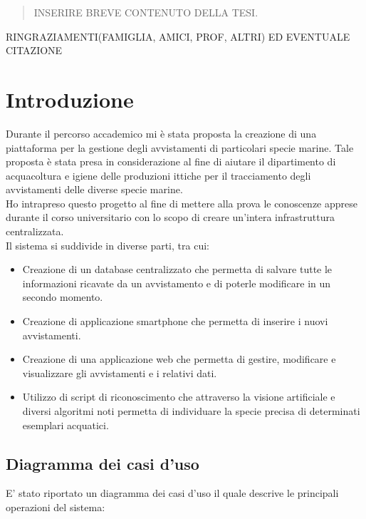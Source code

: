 \documentclass[a4paper,final,12pt]{report}
\begin{document}
\restoregeometry

\begin{abstract}
    INSERIRE BREVE CONTENUTO DELLA TESI.
\end{abstract}

RINGRAZIAMENTI(FAMIGLIA, AMICI, PROF, ALTRI) ED EVENTUALE CITAZIONE

\tableofcontents
\setlength{\parindent}{0pt}
\chapter{Introduzione}
Durante il percorso accademico mi è stata proposta la creazione di una piattaforma per la gestione degli avvistamenti di particolari specie marine. Tale proposta è stata presa in considerazione al fine di aiutare il dipartimento di acquacoltura e igiene delle produzioni ittiche per il tracciamento degli avvistamenti delle diverse specie marine.\\
Ho intrapreso questo progetto al fine di mettere alla prova le conoscenze apprese durante il corso universitario con lo scopo di creare un'intera infrastruttura centralizzata.\\
Il sistema si suddivide in diverse parti, tra cui:
\begin{itemize}
\item Creazione di un database centralizzato che permetta di salvare tutte le informazioni ricavate da un avvistamento e di poterle modificare in un secondo momento.
\item Creazione di applicazione smartphone che permetta di inserire i nuovi avvistamenti.
\item Creazione di una applicazione web che permetta di gestire, modificare e visualizzare gli avvistamenti e i relativi dati.
\item Utilizzo di script di riconoscimento che attraverso la visione artificiale e diversi algoritmi noti permetta di individuare la specie precisa di determinati esemplari acquatici.
\end{itemize}

\section{Diagramma dei casi d'uso}
E' stato riportato un diagramma dei casi d'uso il quale descrive le principali operazioni del sistema:
\end{document}
